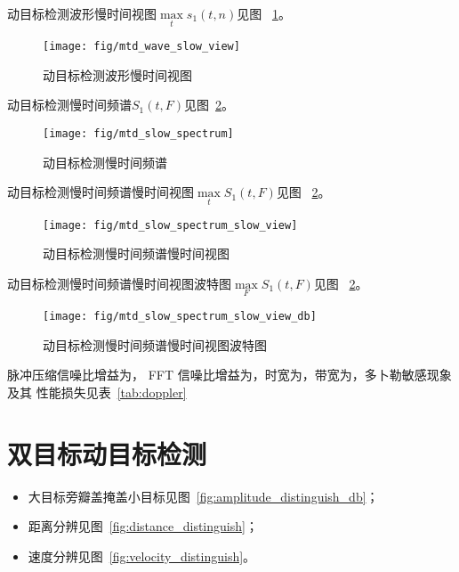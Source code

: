 \documentclass[../main]{subfiles}
\begin{document}
动目标检测波形慢时间视图$\max\limits_t{s_1(t, n)}$见图%
~\ref{fig:mtd_wave_slow_view}。

\begin{figure}[htbp]
  \centering
  \texttt{[image: fig/mtd\_wave\_slow\_view]}
  \caption{动目标检测波形慢时间视图}%
  \label{fig:mtd_wave_slow_view}
\end{figure}

动目标检测慢时间频谱$S_1(t, F)$见图~\ref{fig:mtd_slow_spectrum}。

\begin{figure}[htbp]
  \centering
  \texttt{[image: fig/mtd\_slow\_spectrum]}
  \caption{动目标检测慢时间频谱}%
  \label{fig:mtd_slow_spectrum}
\end{figure}

动目标检测慢时间频谱慢时间视图$\max\limits_tS_1(t, F)$见图%
~\ref{fig:mtd_slow_spectrum}。

\begin{figure}[htbp]
  \centering
  \texttt{[image: fig/mtd\_slow\_spectrum\_slow\_view]}
  \caption{动目标检测慢时间频谱慢时间视图}%
  \label{fig:mtd_slow_spectrum_slow_view}
\end{figure}

动目标检测慢时间频谱慢时间视图波特图$\max\limits_FS_1(t, F)$见图%
~\ref{fig:mtd_slow_spectrum}。

\begin{figure}[htbp]
  \centering
  \texttt{[image: fig/mtd\_slow\_spectrum\_slow\_view\_db]}
  \caption{动目标检测慢时间频谱慢时间视图波特图}%
  \label{fig:mtd_slow_spectrum_slow_view_db}
\end{figure}

\begin{Answer}[ref = ex:3]
  脉冲压缩信噪比增益为， FFT 信噪比增益为，时宽为，带宽为，多卜勒敏感现象及其
  性能损失见表~\ref{tab:doppler}
\end{Answer}

\section{双目标动目标检测}%
\label{sec:double_mtd}

\begin{Answer}[ref = ex:4]
  \begin{itemize}
    \item 大目标旁瓣盖掩盖小目标见图~\ref{fig:amplitude_distinguish_db}；
    \item 距离分辨见图~\ref{fig:distance_distinguish}；
    \item 速度分辨见图~\ref{fig:velocity_distinguish}。
  \end{itemize}
\end{Answer}
\end{document}
